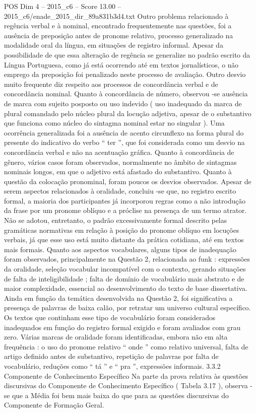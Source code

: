 \begin{textsample}{POS Dim 4 – 2015\_c6 – Score 13.00 – 2015\_c6/enade\_2015\_dir\_89a831b3d4.txt}
Outro problema relacionado à regência verbal e à nominal, encontrado frequentemente nas questões, foi a ausência de preposição antes de pronome relativo, processo generalizado na modalidade oral da língua, em situações de registro informal.
Apesar da possibilidade de que essa alteração de regência se generalize no padrão escrito da Língua Portuguesa, como já está ocorrendo até em textos jornalísticos, o não emprego da preposição foi penalizado neste processo de avaliação.
Outro desvio muito frequente diz respeito aos processos de concordância verbal e de concordância nominal.
Quanto à concordância de número, observou -se ausência de marca com sujeito posposto ou uso indevido ( uso inadequado da marca de plural comandado pelo núcleo plural da locução adjetiva, apesar de o substantivo que funciona como núcleo do sintagma nominal estar no singular ).
Uma ocorrência generalizada foi a ausência de acento circunflexo na forma plural do presente do indicativo do verbo “ ter ”, que foi considerada como um desvio na concordância verbal e não na acentuação gráfica.
Quanto à concordância de gênero, vários casos foram observados, normalmente no âmbito de sintagmas nominais longos, em que o adjetivo está afastado do substantivo.
Quanto à questão da colocação pronominal, foram poucos os desvios observados.
Apesar de serem aspectos relacionados à oralidade, concluiu -se que, no registro escrito formal, a maioria dos participantes já incorporou regras como a não introdução da frase por um pronome oblíquo e a próclise na presença de um termo atrator.
Não se adotou, entretanto, o padrão excessivamente formal descrito pelas gramáticas normativas em relação à posição do pronome oblíquo em locuções verbais, já que esse uso está muito distante da prática cotidiana, até em textos mais formais.
Quanto aos aspectos vocabulares, alguns tipos de inadequação foram observados, principalmente na Questão 2, relacionada ao funk : expressões da oralidade, seleção vocabular incompatível com o contexto, gerando situações de falta de inteligibilidade ; falta de domínio de vocabulário mais abstrato e de maior complexidade, essencial ao desenvolvimento do texto de base dissertativa.
Ainda em função da temática desenvolvida na Questão 2, foi significativa a presença de palavras de baixa calão, por retratar um universo cultural específico.
Os textos que continham esse tipo de vocabulário foram considerados inadequados em função do registro formal exigido e foram avaliados com grau zero.
Várias marcas de oralidade foram identificadas, embora não em alta frequência : o uso do pronome relativo “ onde ” como relativo universal, falta de artigo definido antes de substantivo, repetição de palavras por falta de vocabulário, reduções como “ tá ” e “ pra ”, expressões informais. 3.3.2 Componente de Conhecimento Específico Na parte da prova relativa às questões discursivas do Componente de Conhecimento Específico ( Tabela 3.17 ), observa -se que a Média foi bem mais baixa do que para as questões discursivas do Componente de Formação Geral.

\end{textsample}
